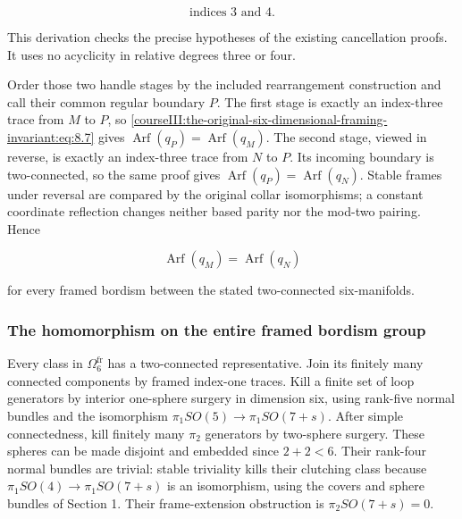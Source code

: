 \begin{equation}
\text{indices }3\text{ and }4.
 \label{courseIII:the-original-six-dimensional-framing-invariant:eq:8.11}
\end{equation}

This derivation checks the precise hypotheses of the existing cancellation proofs. It uses no acyclicity in relative degrees three or four.

Order those two handle stages by the included rearrangement construction and call their common regular boundary \(P\). The first stage is exactly an index-three trace from \(M\) to \(P\), so \eqref{courseIII:the-original-six-dimensional-framing-invariant:eq:8.7} gives \(\operatorname{Arf}(q_P)=\operatorname{Arf}(q_M)\). The second stage, viewed in reverse, is exactly an index-three trace from \(N\) to \(P\). Its incoming boundary is two-connected, so the same proof gives \(\operatorname{Arf}(q_P)=\operatorname{Arf}(q_N)\). Stable frames under reversal are compared by the original collar isomorphisms; a constant coordinate reflection changes neither based parity nor the mod-two pairing. Hence

\begin{equation}
\operatorname{Arf}(q_M)
                               =\operatorname{Arf}(q_N)
 \label{courseIII:the-original-six-dimensional-framing-invariant:eq:8.12}
\end{equation}

for every framed bordism between the stated two-connected six-manifolds.

\subsubsection{The homomorphism on the entire framed bordism group}
\label{courseIII:the-original-six-dimensional-framing-invariant:section-8.4}

Every class in \(\Omega^{\mathrm{fr}}_6\) has a two-connected representative. Join its finitely many connected components by framed index-one traces. Kill a finite set of loop generators by interior one-sphere surgery in dimension six, using rank-five normal bundles and the isomorphism \(\pi_1SO(5)\to\pi_1SO(7+s)\). After simple connectedness, kill finitely many \(\pi_2\) generators by two-sphere surgery. These spheres can be made disjoint and embedded since \(2+2<6\). Their rank-four normal bundles are trivial: stable triviality kills their clutching class because \(\pi_1SO(4)\to\pi_1SO(7+s)\) is an isomorphism, using the covers and sphere bundles of Section 1. Their frame-extension obstruction is \(\pi_2SO(7+s)=0\).

